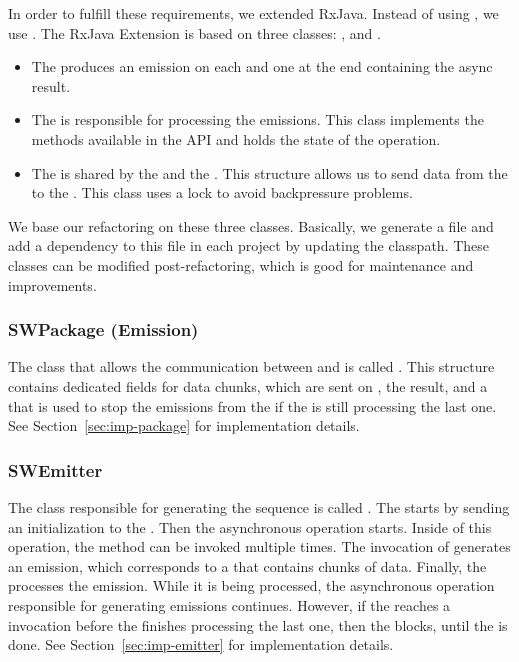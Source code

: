 \documentclass[type=bsc,accentcolor=tud9c]{tudthesis}
\begin{document}
In order to fulfill these requirements, we extended RxJava. Instead of using , we use . The RxJava Extension is based on three classes: ,  and . 
\begin{itemize}
	\item The  produces an emission on each  and one at the end containing the async result.
	\item The  is responsible for processing the emissions. This class implements the methods available in the  API and holds the state of the operation.
	\item The  is shared by the  and the . This structure allows us to send data from the  to the . This class uses a lock to avoid backpressure problems.
\end{itemize}

We base our refactoring on these three classes. Basically, we generate a  file and add a dependency to this file in each project by updating the classpath. These classes can be modified post-refactoring, which is good for maintenance and improvements.

\subsubsection{SWPackage (Emission)}
The class that allows the communication between  and  is called . This structure contains dedicated fields for data chunks, which are sent on , the result, and a  that is used to stop the emissions from the  if the  is still processing the last one. See Section~\ref{sec:imp-package} for implementation details.

\subsubsection{SWEmitter}
The class responsible for generating the sequence is called . The  starts by sending an initialization  to the . Then the asynchronous operation starts. Inside of this operation, the method  can be invoked multiple times. The invocation of  generates an emission, which corresponds to a  that contains chunks of data. Finally, the  processes the emission. While it is being processed, the asynchronous operation responsible for generating emissions continues. However, if the  reaches a  invocation before the  finishes processing the last one, then the  blocks, until the  is done. See Section~\ref{sec:imp-emitter}  for implementation details.
\end{document}
